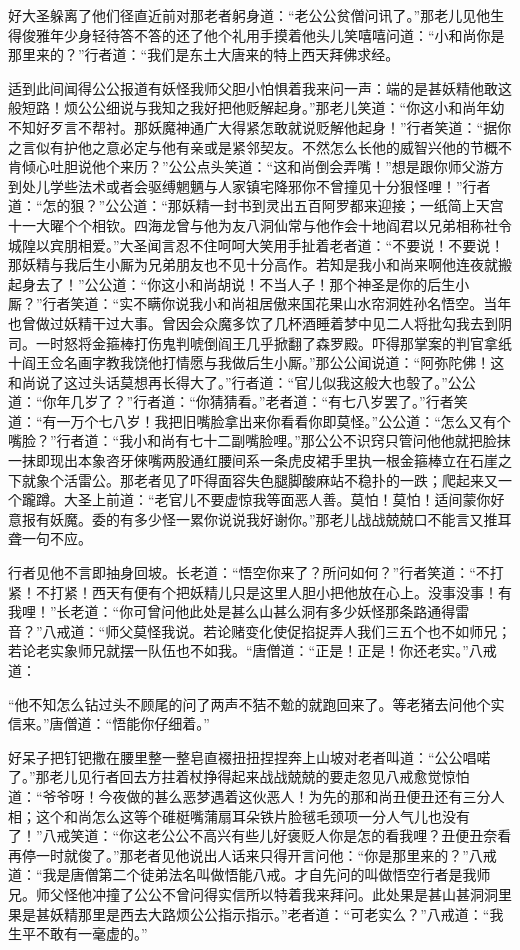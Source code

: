 \documentclass[12pt,UTF8]{ctexbook}
\begin{document}
好大圣躲离了他们径直近前对那老者躬身道：“老公公贫僧问讯了。”那老儿见他生得俊雅年少身轻待答不答的还了他个礼用手摸着他头儿笑嘻嘻问道：“小和尚你是那里来的？”行者道：“我们是东土大唐来的特上西天拜佛求经。

适到此间闻得公公报道有妖怪我师父胆小怕惧着我来问一声：端的是甚妖精他敢这般短路！烦公公细说与我知之我好把他贬解起身。”那老儿笑道：“你这小和尚年幼不知好歹言不帮衬。那妖魔神通广大得紧怎敢就说贬解他起身！”行者笑道：“据你之言似有护他之意必定与他有亲或是紧邻契友。不然怎么长他的威智兴他的节概不肯倾心吐胆说他个来历？”公公点头笑道：“这和尚倒会弄嘴！”想是跟你师父游方到处儿学些法术或者会驱缚魍魉与人家镇宅降邪你不曾撞见十分狠怪哩！”行者道：“怎的狠？”公公道：“那妖精一封书到灵出五百阿罗都来迎接；一纸简上天宫十一大曜个个相钦。四海龙曾与他为友八洞仙常与他作会十地阎君以兄弟相称社令城隍以宾朋相爱。”大圣闻言忍不住呵呵大笑用手扯着老者道：“不要说！不要说！那妖精与我后生小厮为兄弟朋友也不见十分高作。若知是我小和尚来啊他连夜就搬起身去了！”公公道：“你这小和尚胡说！不当人子！那个神圣是你的后生小厮？”行者笑道：“实不瞒你说我小和尚祖居傲来国花果山水帘洞姓孙名悟空。当年也曾做过妖精干过大事。曾因会众魔多饮了几杯酒睡着梦中见二人将批勾我去到阴司。一时怒将金箍棒打伤鬼判唬倒阎王几乎掀翻了森罗殿。吓得那掌案的判官拿纸十阎王佥名画字教我饶他打情愿与我做后生小厮。”那公公闻说道：“阿弥陀佛！这和尚说了这过头话莫想再长得大了。”行者道：“官儿似我这般大也彀了。”公公道：“你年几岁了？”行者道：“你猜猜看。”老者道：“有七八岁罢了。”行者笑道：“有一万个七八岁！我把旧嘴脸拿出来你看看你即莫怪。”公公道：“怎么又有个嘴脸？”行者道：“我小和尚有七十二副嘴脸哩。”那公公不识窍只管问他他就把脸抹一抹即现出本象咨牙倈嘴两股通红腰间系一条虎皮裙手里执一根金箍棒立在石崖之下就象个活雷公。那老者见了吓得面容失色腿脚酸麻站不稳扑的一跌；爬起来又一个躘蹲。大圣上前道：“老官儿不要虚惊我等面恶人善。莫怕！莫怕！适间蒙你好意报有妖魔。委的有多少怪一累你说说我好谢你。”那老儿战战兢兢口不能言又推耳聋一句不应。

行者见他不言即抽身回坡。长老道：“悟空你来了？所问如何？”行者笑道：“不打紧！不打紧！西天有便有个把妖精儿只是这里人胆小把他放在心上。没事没事！有我哩！”长老道：“你可曾问他此处是甚么山甚么洞有多少妖怪那条路通得雷音？”八戒道：“师父莫怪我说。若论赌变化使促掐捉弄人我们三五个也不如师兄；若论老实象师兄就摆一队伍也不如我。“唐僧道：“正是！正是！你还老实。”八戒道：

“他不知怎么钻过头不顾尾的问了两声不狤不魀的就跑回来了。等老猪去问他个实信来。”唐僧道：“悟能你仔细着。”

好呆子把钉钯撒在腰里整一整皂直裰扭扭捏捏奔上山坡对老者叫道：“公公唱喏了。”那老儿见行者回去方拄着杖挣得起来战战兢兢的要走忽见八戒愈觉惊怕道：“爷爷呀！今夜做的甚么恶梦遇着这伙恶人！为先的那和尚丑便丑还有三分人相；这个和尚怎么这等个碓梃嘴蒲扇耳朵铁片脸毧毛颈项一分人气儿也没有了！”八戒笑道：“你这老公公不高兴有些儿好褒贬人你是怎的看我哩？丑便丑奈看再停一时就俊了。”那老者见他说出人话来只得开言问他：“你是那里来的？”八戒道：“我是唐僧第二个徒弟法名叫做悟能八戒。才自先问的叫做悟空行者是我师兄。师父怪他冲撞了公公不曾问得实信所以特着我来拜问。此处果是甚山甚洞洞里果是甚妖精那里是西去大路烦公公指示指示。”老者道：“可老实么？”八戒道：“我生平不敢有一毫虚的。”
\end{document}
